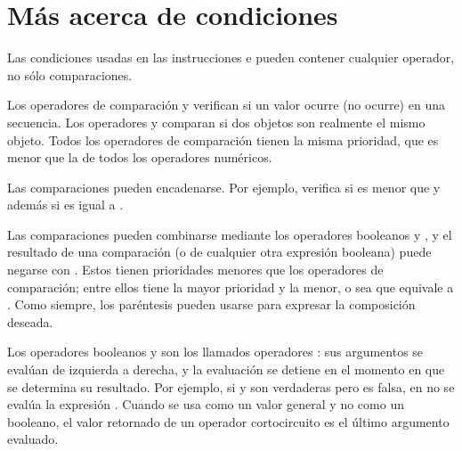 \documentclass[a5paper,10pt,spanish]{sphinxmanual}
\begin{document}
\section{Más acerca de condiciones}
\label{\detokenize{tutorial/datastructures:more-on-conditions}}\label{\detokenize{tutorial/datastructures:tut-conditions}}
\sphinxAtStartPar
Las condiciones usadas en las instrucciones  e  pueden contener cualquier operador, no sólo comparaciones.

\sphinxAtStartPar
Los operadores de comparación  y  verifican si un valor ocurre (no ocurre) en una secuencia. Los operadores  y  comparan si dos objetos son realmente el mismo objeto. Todos los operadores de comparación tienen la misma prioridad, que es menor que la de todos los operadores numéricos.

\sphinxAtStartPar
Las comparaciones pueden encadenarse.  Por ejemplo,  verifica si  es menor que  y además si  es igual a .

\sphinxAtStartPar
Las comparaciones pueden combinarse mediante los operadores booleanos  y , y el resultado de una comparación (o de cualquier otra expresión booleana) puede negarse con .  Estos tienen prioridades menores que los operadores de comparación; entre ellos  tiene la mayor prioridad y  la menor, o sea que  equivale a .  Como siempre, los paréntesis pueden usarse para expresar la composición deseada.

\sphinxAtStartPar
Los operadores booleanos  y  son los llamados operadores : sus argumentos se evalúan de izquierda a derecha, y la evaluación se detiene en el momento en que se determina su resultado.  Por ejemplo, si  y  son verdaderas pero  es falsa, en  no se evalúa la expresión .  Cuando se usa como un valor general y no como un booleano, el valor retornado de un operador cortocircuito es el último argumento evaluado.
\end{document}
